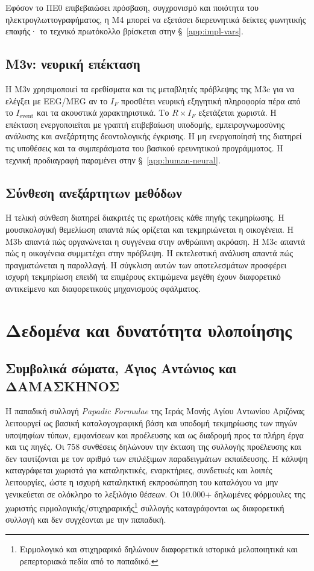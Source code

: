 \documentclass[11pt,a4paper]{article}
\begin{document}
Εφόσον το ΠΕ0 επιβεβαιώσει πρόσβαση, συγχρονισμό και ποιότητα του ηλεκτρογλωττογραφήματος, η M4 μπορεί να εξετάσει διερευνητικά δείκτες φωνητικής επαφής· το τεχνικό πρωτόκολλο βρίσκεται στην §~\ref{app:impl-vars}.

\subsection{M3ν: νευρική επέκταση}\label{sec:m3nu}

Η M3ν χρησιμοποιεί τα ερεθίσματα και τις μεταβλητές πρόβλεψης της M3c για να ελέγξει με EEG/MEG αν το $I_F$ προσθέτει νευρική εξηγητική πληροφορία πέρα από το $I_{\mathrm{event}}$ και τα ακουστικά χαρακτηριστικά. Το $R\times I_F$ εξετάζεται χωριστά. Η επέκταση ενεργοποιείται με γραπτή επιβεβαίωση υποδομής, εμπειρογνωμοσύνης ανάλυσης και ανεξάρτητης δεοντολογικής έγκρισης. Η μη ενεργοποίησή της διατηρεί τις υποθέσεις και τα συμπεράσματα του βασικού ερευνητικού προγράμματος. Η τεχνική προδιαγραφή παραμένει στην §~\ref{app:human-neural}.

\subsection{Σύνθεση ανεξάρτητων μεθόδων}

Η τελική σύνθεση διατηρεί διακριτές τις ερωτήσεις κάθε πηγής τεκμηρίωσης. Η μουσικολογική θεμελίωση απαντά πώς ορίζεται και τεκμηριώνεται η οικογένεια. Η M3b απαντά πώς οργανώνεται η συγγένεια στην ανθρώπινη ακρόαση. Η M3c απαντά πώς η οικογένεια συμμετέχει στην πρόβλεψη. Η εκτελεστική ανάλυση απαντά πώς πραγματώνεται η παραλλαγή. Η σύγκλιση αυτών των αποτελεσμάτων προσφέρει ισχυρή τεκμηρίωση επειδή τα επιμέρους εκτιμώμενα μεγέθη έχουν διαφορετικό αντικείμενο και διαφορετικούς μηχανισμούς σφάλματος.

\section{Δεδομένα και δυνατότητα υλοποίησης}

\subsection{Συμβολικά σώματα, Άγιος Αντώνιος και ΔΑΜΑΣΚΗΝΟΣ}\label{sec:training-pool}

Η παπαδική συλλογή \emph{Papadic Formulae} της Ιεράς Μονής Αγίου Αντωνίου Αριζόνας λειτουργεί ως βασική καταλογογραφική βάση και υποδομή τεκμηρίωσης των πηγών υποψηφίων τύπων, εμφανίσεων και προέλευσης και ως διαδρομή προς τα πλήρη έργα και τις πηγές. Οι 758 συνθέσεις δηλώνουν την έκταση της συλλογής προέλευσης και δεν ταυτίζονται με τον αριθμό των επιλέξιμων παραδειγμάτων εκπαίδευσης. Η κάλυψη καταγράφεται χωριστά για καταληκτικές, εναρκτήριες, συνδετικές και λοιπές λειτουργίες, ώστε η ισχυρή καταληκτική εκπροσώπηση του καταλόγου να μην γενικεύεται σε ολόκληρο το λεξιλόγιο θέσεων. Οι 10.000+ δηλωμένες φόρμουλες της χωριστής ειρμολογικής/στιχηραρικής\footnote{Ειρμολογικό και στιχηραρικό δηλώνουν διαφορετικά ιστορικά μελοποιητικά και ρεπερτοριακά πεδία από το παπαδικό.} συλλογής καταγράφονται ως διαφορετική συλλογή και δεν συγχέονται με την παπαδική.
\end{document}
